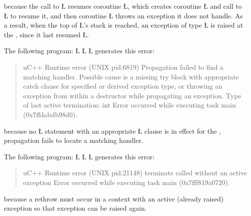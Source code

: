 \documentclass[openright,twoside]{report}
\begin{document}
because the call to \LGinlinetrue\LGbegin\lgrinde\L{}\endlgrinde\LGend{} resumes coroutine \LGinlinetrue\LGbegin\lgrinde\L{}\endlgrinde\LGend{}, which creates coroutine \LGinlinetrue\LGbegin\lgrinde\L{}\endlgrinde\LGend{} and call to \LGinlinetrue\LGbegin\lgrinde\L{}\endlgrinde\LGend{} to resume it, and then coroutine \LGinlinetrue\LGbegin\lgrinde\L{}\endlgrinde\LGend{} throws an exception it does not handle.
As a result, when the top of \LGinlinetrue\LGbegin\lgrinde\L{}\endlgrinde\LGend{}'s stack is reached, an exception of type \LGinlinetrue\LGbegin\lgrinde\L{}\endlgrinde\LGend{} is raised at the , since it last resumed \LGinlinetrue\LGbegin\lgrinde\L{}\endlgrinde\LGend{}.

The following program:
\LGinlinefalse\LGbegin\lgrinde
\L{}
\L{\LB{}}
\L{\LB{\}}}
\endlgrinde\LGend
generates this error:
\begin{quote}
\BGfont
uC++ Runtime error (UNIX pid:6819) Propagation failed to find a matching handler.
Possible cause is a missing try block with appropriate catch clause for specified or derived exception type,
or throwing an exception from within a destructor while propagating an exception.
Type of last active termination: int
Error occurred while executing task main (0x7ffdabdb98d0).
\end{quote}
because no \LGinlinetrue\LGbegin\lgrinde\L{}\endlgrinde\LGend{} statement with an appropriate \LGinlinetrue\LGbegin\lgrinde\L{}\endlgrinde\LGend{} clause is in effect for the , propagation fails to locate a matching handler.

The following program:
\LGinlinefalse\LGbegin\lgrinde
\L{}
\L{\LB{}}
\CE{}\L{\LB{\}}}
\endlgrinde\LGend
generates this error:
\begin{quote}
\BGfont
uC++ Runtime error (UNIX pid:21148) terminate called without an active exception
Error occurred while executing task main (0x7fff819a0720).
\end{quote}
because a rethrow must occur in a context with an active (already raised) exception so that exception can be raised again.
\end{document}

